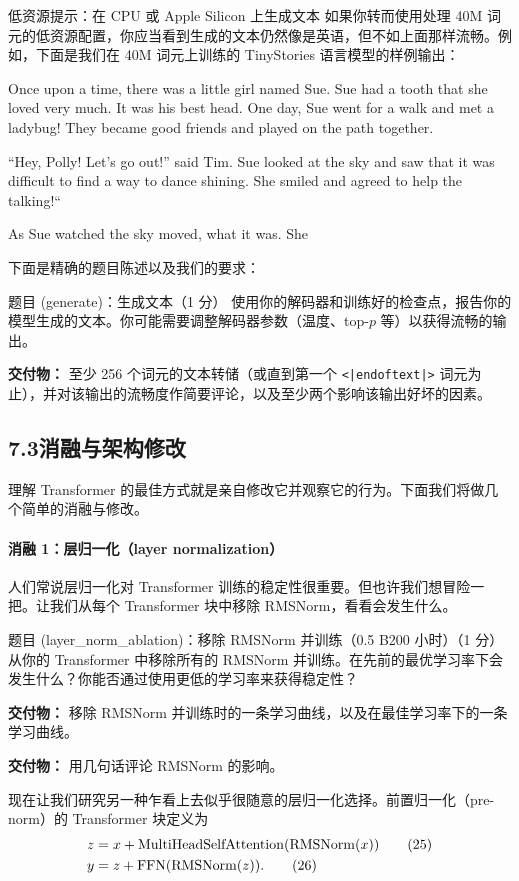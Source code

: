 \begin{tipbox}{低资源提示：在 CPU 或 Apple Silicon 上生成文本}
如果你转而使用处理 40M 词元的低资源配置，你应当看到生成的文本仍然像是英语，但不如上面那样流畅。例如，下面是我们在 40M 词元上训练的 TinyStories 语言模型的样例输出：

\medskip
Once upon a time, there was a little girl named Sue. Sue had a tooth that she loved very much. It was his best head. One day, Sue went for a walk and met a ladybug! They became good friends and played on the path together.

``Hey, Polly! Let's go out!'' said Tim. Sue looked at the sky and saw that it was difficult to find a way to dance shining. She smiled and agreed to help the talking!``

As Sue watched the sky moved, what it was. She
\end{tipbox}

下面是精确的题目陈述以及我们的要求：

\begin{problembox}{题目 (generate)：生成文本（1 分）}
使用你的解码器和训练好的检查点，报告你的模型生成的文本。你可能需要调整解码器参数（温度、top-$p$ 等）以获得流畅的输出。

\begin{deliverablebox}
\textbf{交付物：} 至少 256 个词元的文本转储（或直到第一个 \texttt{<|endoftext|>} 词元为止），并对该输出的流畅度作简要评论，以及至少两个影响该输出好坏的因素。
\end{deliverablebox}
\end{problembox}

\subsection*{7.3\quad 消融与架构修改}
理解 Transformer 的最佳方式就是亲自修改它并观察它的行为。下面我们将做几个简单的消融与修改。

\paragraph{消融 1：层归一化（layer normalization）}
人们常说层归一化对 Transformer 训练的稳定性很重要。但也许我们想冒险一把。让我们从每个 Transformer 块中移除 RMSNorm，看看会发生什么。

\begin{problembox}{题目 (layer\_norm\_ablation)：移除 RMSNorm 并训练（0.5 B200 小时）（1 分）}
从你的 Transformer 中移除所有的 RMSNorm 并训练。在先前的最优学习率下会发生什么？你能否通过使用更低的学习率来获得稳定性？

\begin{deliverablebox}
\textbf{交付物：} 移除 RMSNorm 并训练时的一条学习曲线，以及在最佳学习率下的一条学习曲线。
\end{deliverablebox}

\begin{deliverablebox}
\textbf{交付物：} 用几句话评论 RMSNorm 的影响。
\end{deliverablebox}
\end{problembox}

现在让我们研究另一种乍看上去似乎很随意的层归一化选择。前置归一化（pre-norm）的 Transformer 块定义为
\begin{align*}
z &= x + \operatorname{MultiHeadSelfAttention}(\operatorname{RMSNorm}(x)) \tag{25} \\
y &= z + \operatorname{FFN}(\operatorname{RMSNorm}(z)). \tag{26}
\end{align*}

